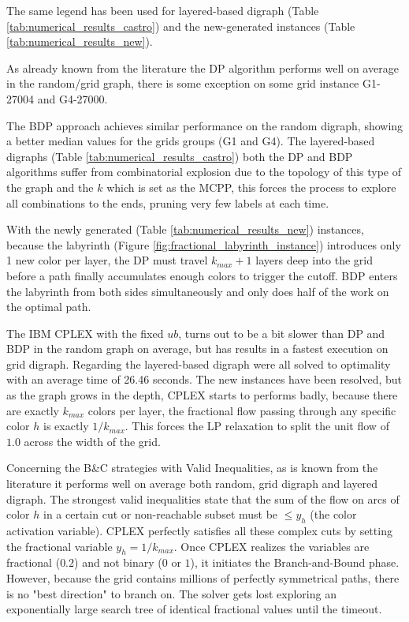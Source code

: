 \documentclass[pdflatex,sn-mathphys-num]{sn-jnl}
\begin{document}
The same legend has been used for layered-based digraph (Table \ref{tab:numerical_results_castro}) and the new-generated instances (Table \ref{tab:numerical_results_new}).

As already known from the literature \cite{Ferone2021} the DP algorithm performs well on average in the random/grid graph, there is some exception on some grid instance G1-27004 and G4-27000. 

The BDP approach achieves similar performance on the random digraph, showing a better median values for the grids groups (G1 and G4).
The layered-based digraphs (Table \ref{tab:numerical_results_castro})
both the DP and BDP algorithms suffer from combinatorial explosion due to the topology of this type of the graph and the $k$ which is set as the MCPP, this forces the process to explore all 
combinations to the ends, pruning very few labels at each time.

With the newly generated (Table \ref{tab:numerical_results_new}) instances, because 
the labyrinth (Figure \ref{fig:fractional_labyrinth_instance}) introduces only 1 new color per layer, 
the DP must travel $k_{max} + 1$ layers deep into the grid before a path finally accumulates enough colors to trigger the cutoff.
BDP enters the labyrinth from both sides simultaneously and only does half of the work on the optimal path.

The IBM CPLEX with the fixed $\textit{ub}$, turns out to be a bit slower than DP and BDP in the random graph on average, but 
has results in a fastest execution on grid digraph. Regarding the layered-based digraph were all solved to optimality with an average time of 26.46 seconds.
The new instances have been resolved, but as the graph grows in the depth, CPLEX starts to performs badly, because
there are exactly $k_{max}$ colors per layer, the fractional flow passing through any specific color $h$ is exactly $1/k_{max}$.
This forces the LP relaxation to split the unit flow of $1.0$ across the width of the grid.

Concerning the B\&C strategies with Valid Inequalities, as is known from the literature \cite{Castro2024} it performs well on average both random, grid digraph and layered digraph.
The strongest valid inequalities state that the sum of the flow on arcs of color $h$ in a certain cut or non-reachable subset must be $\le y_h$ (the color activation variable). 
CPLEX perfectly satisfies all these complex cuts by setting the fractional variable $y_h = 1/k_{max}$.
Once CPLEX realizes the variables are fractional ($0.2$) and not binary ($0$ or $1$), it initiates the Branch-and-Bound phase. 
However, because the grid contains millions of perfectly symmetrical paths, there is no "best direction" to branch on. 
The solver gets lost exploring an exponentially large search tree of identical fractional values until the timeout.
\end{document}
